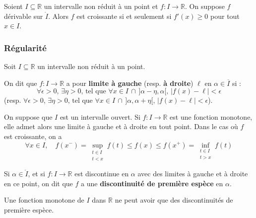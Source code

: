 
  \begin{proposition}
    Soient $I \subseteq \mathbb{R}$ un intervalle non réduit à un point et $f : I \rightarrow \mathbb{R}$. On suppose $f$ dérivable sur $\mathring{I}$. Alors $f$ est croissante si et seulement si $f'(x) \geq 0$ pour tout $x \in I$.
  \end{proposition}

  \subsubsection{Régularité}


  Soit $I \subseteq \mathbb{R}$ un intervalle non réduit à un point.

  \begin{definition}
    On dit que $f : I \rightarrow \mathbb{R}$ a pour \textbf{limite à gauche} (resp. \textbf{à droite}) $\ell$ en $\alpha \in \overline{I}$ si :
    \[ \forall \epsilon > 0, \, \exists \eta > 0, \, \text{tel que } \forall x \in I \, \cap \, ]\alpha-\eta, \alpha[, \, |f(x) - \ell| < \epsilon \]
    (resp. $\forall \epsilon > 0, \, \exists \eta > 0, \, \text{tel que } \forall x \in I \, \cap \, ]\alpha, \alpha+\eta[, \, |f(x) - \ell| < \epsilon$).
  \end{definition}

  \begin{theorem}
    On suppose que $I$ est un intervalle ouvert. Si $f : I \rightarrow \mathbb{R}$ est une fonction monotone, elle admet alors une limite à gauche et à droite en tout point. Dans le cas où $f$ est croissante, on a
    \[ \forall x \in I, \quad f(x^-) = \sup_{\substack{t \in I \\ t < x}} f(t) \leq f(x) \leq f(x^+) = \inf_{\substack{t \in I \\ t > x}} f(t) \]
  \end{theorem}

  \begin{definition}
    Si $\alpha \in \mathring{I}$, et si $f : I \rightarrow \mathbb{R}$ est discontinue en $\alpha$ avec des limites à gauche et à droite en ce point, on dit que $f$ a une \textbf{discontinuité de première espèce} en $\alpha$.
  \end{definition}

  \begin{proposition}
    Une fonction monotone de $I$ dans $\mathbb{R}$ ne peut avoir que des discontinuités de première espèce.
  \end{proposition}


